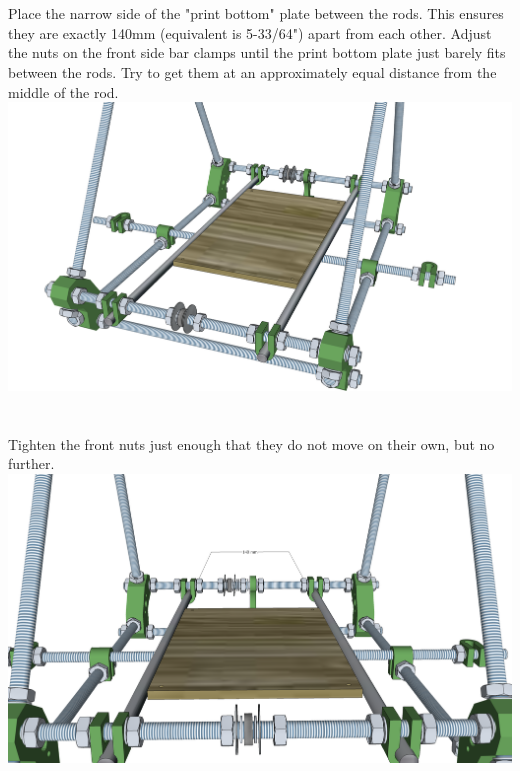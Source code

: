 \documentclass[twoside,openany,a4paper,titlepage]{memoir}
\begin{document}
	\section{}
	Place the narrow side of the "print bottom" plate between the rods. This ensures they are exactly
	140mm (equivalent is 5-33/64") apart from each other. Adjust the nuts on the front side bar clamps until
	the print bottom plate just barely fits between the rods. Try to get them at an approximately equal
	distance from the middle of the rod.\\
	\includegraphics[width=1\linewidth]{graphics/ch6_5.png}
	
	\section{}
	Tighten the front nuts just enough that they do not move on their own, but no further.\\
	\includegraphics[width=1\linewidth]{graphics/ch6_6.png}
	
\end{document}
